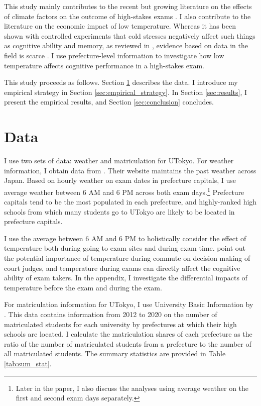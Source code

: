 \documentclass[12pt,letterpaper]{article}
\begin{document}
This study mainly contributes to the recent but growing literature on the effects of climate factors on the outcome of high-stakes exams \citep{Park2020b, Cho2017}.
I also contribute to the literature on the economic impact of low temperature.
Whereas it has been shown with controlled experiments that cold stresses negatively affect such things as cognitive ability and memory, as reviewed in \citet{Taylor2016}, evidence based on data in the field is scarce \citep{Burke2015, Stevens2017}.
I use prefecture-level information to investigate how low temperature affects cognitive performance in a high-stakes exam.

This study proceeds as follows.
Section \ref{sec:data} describes the data. 
I introduce my empirical strategy in Section \ref{sec:empirical_strategy}.
In Section \ref{sec:results}, I present the empirical results, and Section \ref{sec:conclusion} concludes.
  
\section{Data}\label{sec:data}

I use two sets of data: weather and matriculation for UTokyo.
For weather information, I obtain data from .
Their website maintains the past weather across Japan.
Based on hourly weather on exam dates in prefecture capitals, I use average weather between 6 AM and 6 PM across both exam days.\footnote{
  Later in the paper, I also discuss the analyses using average weather on the first and second exam days separately.
}
Prefecture capitals tend to be the most populated in each prefecture, and highly-ranked high schools from which many students go to UTokyo are likely to be located in prefecture capitals.

I use the average between 6 AM and 6 PM to holistically consider the effect of temperature both during going to exam sites and during exam time.
\citet{Heyes2019} point out the potential importance of temperature during commute on decision making of court judges, and temperature during exams can directly affect the cognitive ability of exam takers. 
In the appendix, I investigate the differential impacts of temperature before the exam and during the exam.

For matriculation information for UTokyo, I use University Basic Information by .
This data contains information from 2012 to 2020 on the number of matriculated students for each university by prefectures at which their high schools are located.
I calculate the matriculation shares of each prefecture as the ratio of the number of matriculated students from a prefecture to the number of all matriculated students.
The summary statistics are provided in Table \ref{tab:sum_stat}.
\end{document}

